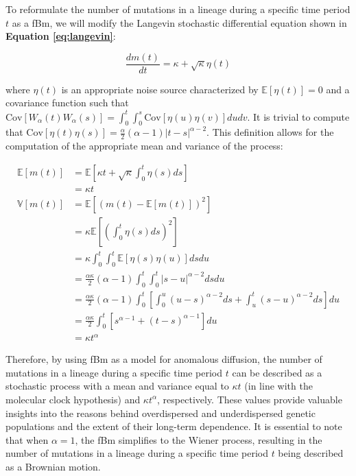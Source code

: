 \documentclass{./LatexTemplate/svproc}
\begin{document}
To reformulate the number of mutations in a lineage during a specific time period $t$ as a fBm, we will modify the Langevin stochastic differential equation shown in \textbf{Equation \ref{eq:langevin}}:

\begin{equation}
    \frac{dm(t)}{dt} = \kappa + \sqrt{\kappa}\eta(t)\label{eq:langevin-fbm}
\end{equation}

where $\eta(t)$ is an appropriate noise source characterized by $\mathbb{E}\left[\eta(t)\right]=0$ and a covariance function such that $\text{Cov}\left[W_\alpha(t)W_\alpha(s)\right] = \int_0^t\int_0^s\text{Cov}\left[\eta(u)\eta(v)\right]dudv$. It is trivial to compute that $\text{Cov}\left[\eta(t)\eta(s)\right] = \frac{\alpha}{2}(\alpha - 1)\left|t - s\right|^{\alpha - 2}$. This definition allows for the computation of the appropriate mean and variance of the process:

\begin{align}
    \mathbb{E}\left[m(t)\right] &= \mathbb{E}\left[\kappa t + \sqrt{\kappa}\int_0^t \eta(s)ds\right]\\
    &= \kappa t\\
    \mathbb{V}\left[m(t)\right] &= \mathbb{E}\left[\left(m(t) - \mathbb{E}\left[m(t)\right]\right)^2\right]\\
    &= \kappa\mathbb{E}\left[\left(\int_0^t \eta(s)ds\right)^2\right]\nonumber\\
    &= \kappa\int_0^t\int_0^t\mathbb{E}\left[\eta(s)\eta(u)\right]dsdu\nonumber\\
    &= \frac{\alpha\kappa}{2}(\alpha - 1)\int_0^t\int_0^t\left|s - u\right|^{\alpha - 2}dsdu\nonumber\\
    &= \frac{\alpha\kappa}{2}(\alpha - 1)\int_0^t\left[\int_0^u\left(u - s\right)^{\alpha - 2}ds + \int_u^t\left(s - u\right)^{\alpha - 2}ds\right]du\nonumber\\
    &= \frac{\alpha\kappa}{2}\int_0^t\left[s^{\alpha-1}+(t-s)^{\alpha - 1}\right]du\nonumber\\
    &= \kappa t^\alpha
\end{align}

Therefore, by using fBm as a model for anomalous diffusion, the number of mutations in a lineage during a specific time period $t$ can be described as a stochastic process with a mean and variance equal to $\kappa t$ (in line with the molecular clock hypothesis) and $\kappa t^\alpha$, respectively. These values provide valuable insights into the reasons behind overdispersed and underdispersed genetic populations and the extent of their long-term dependence. It is essential to note that when $\alpha = 1$, the fBm simplifies to the Wiener process, resulting in the number of mutations in a lineage during a specific time period $t$ being described as a Brownian motion.
\end{document}
